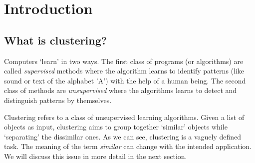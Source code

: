 \documentclass[letterpaper,12pt,titlepage,oneside,final]{book}
\begin{document}
 








\chapter{Introduction}
\section{What is clustering?}
Computers `learn' in two ways. The first class of programs (or algorithms) are called \textit{supervised} methods where the algorithm learns to identify patterns (like sound or text of the alphabet 'A') with the help of a human being.  The second class of methods are \textit{unsupervised} where the algorithms learns to detect and distinguish patterns by themselves. 

Clustering refers to a class of unsupervised learning algorithms. Given a list of objects as input, clustering aims to group together `similar' objects while `separating' the dissimilar ones. As we can see, clustering is a vaguely defined task. The meaning of the term \textit{similar} can change with the intended application. We will discuss this issue in more detail in the next section. 
\end{document}
